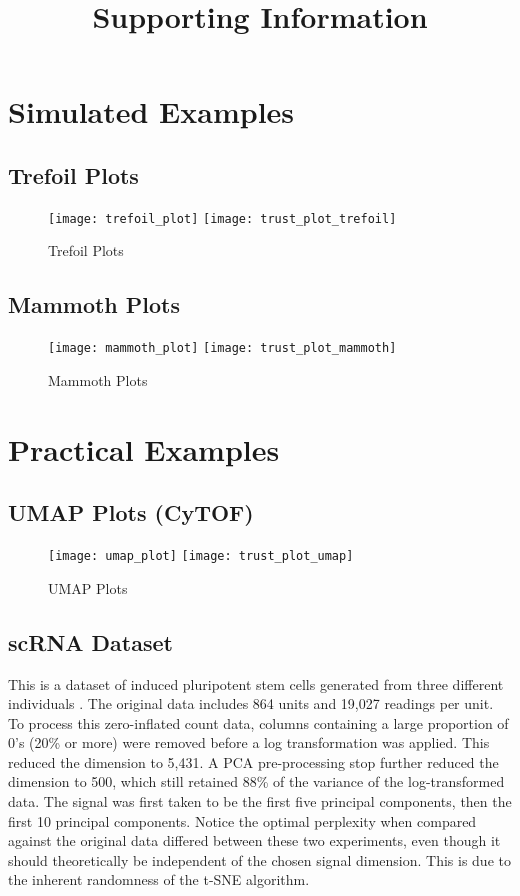 \documentclass{article}
\title{Supporting Information}
\date{}
\renewcommand{\thesection}{S\Roman{section}}
\renewcommand{\thefigure}{S\arabic{figure}}
\begin{document}
\maketitle

\setcounter{section}{0}
\setcounter{figure}{0}
\renewcommand{\thesection}{S\Roman{section}}
\renewcommand{\thefigure}{S\arabic{figure}}

\section{Simulated Examples}
\subsection{Trefoil Plots}

\begin{figure}[H]
\centering
\texttt{[image: trefoil\_plot]}
\texttt{[image: trust\_plot\_trefoil]}
\caption{Trefoil Plots}
\end{figure}

\subsection{Mammoth Plots}
\begin{figure}[H]
\centering
\texttt{[image: mammoth\_plot]}
\texttt{[image: trust\_plot\_mammoth]}
\caption{Mammoth Plots}
\end{figure}

\section{Practical Examples}

\subsection{UMAP Plots (CyTOF)}

\begin{figure}[H]
\centering
\texttt{[image: umap\_plot]}
\texttt{[image: trust\_plot\_umap]}
\caption{UMAP Plots}
\end{figure}

\subsection{scRNA Dataset}
This is a dataset of induced pluripotent stem cells generated from three different individuals \cite{scRNA data}. The original data includes 864 units and 19,027 readings per unit. To process this zero-inflated count data, columns containing a large proportion of 0's (20\% or more) were removed before a log transformation was applied. This reduced the dimension to 5,431. A PCA pre-processing stop further reduced the dimension to 500, which still retained 88\% of the variance of the log-transformed data. The signal was first taken to be the first five principal components, then the first 10 principal components. Notice the optimal perplexity when compared against the original data differed between these two experiments, even though it should theoretically be independent of the chosen signal dimension. This is due to the inherent randomness of the t-SNE algorithm.
\end{document}
